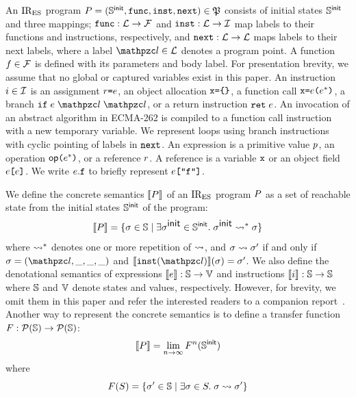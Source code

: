 An $\text{IR}_\text{ES}$ program $\prog = (\initstset, \getfunc,
\getinst, \getnext) \in \progset $ consists of initial states
$\mathbb{S}^{\textsf{init}}$ and three mappings; $\getfunc: \labset \rightarrow
\funcset$ and $\getinst: \labset \rightarrow \instset$ map labels to
their functions and instructions, respectively, and $\getnext: \labset
\rightarrow \labset$ maps labels to their next labels, where a label $\lab \in
\labset$ denotes a program point.  A function $f \in \mathcal{F}$ is defined
with its parameters and body label.  For presentation brevity, we assume that no
global or captured variables exist in this paper.  An instruction $i \in
\mathcal{I}$ is an assignment $\refer \kweq \expr$, an object allocation $\varx
\kweq \kwcl \kwcr$, a function call $\varx \kweq \expr \kwrl \expr^* \kwrr$, a
branch $\kwif \; \expr \; \lab \; \lab$, or a return instruction $\kwret \;
\expr$.  An invocation of an abstract algorithm in ECMA-262 is compiled to a
function call instruction with a new temporary variable.  We represent loops
using branch instructions with cyclic pointing of labels in $\getnext$.
An expression is a primitive value $p$, an operation $\op \kwrl \expr^*
\kwrr$, or a reference $r$.  A reference is a variable $\varx$ or an object
field $\expr \kwsl \expr \kwsr$.  We write $\expr.\varf$ to briefly represent
$\expr \kwsl \code{"f"} \kwsr$.

We define the concrete semantics $\llbracket{P}\rrbracket$ of an $\text{IR}_\text{ES}$ program $P$ as
a set of reachable state from the initial states $\mathbb{S}^{\textsf{init}}$ of the
program:
\[
  \sem{\prog} = \{ \st \in \stset \mid \exists \initst \in \initstset. \;
  \initst \trans^* \st \}
\]
where $\leadsto^*$ denotes one or more repetition of $\leadsto$, and
$\sigma \leadsto \sigma'$ if and only if $\st = (\lab, \_, \_, \_)$ and
$\sem{\getinst(\lab)}(\st) = \st'$.  We also define the denotational
semantics of expressions $\llbracket{e}\rrbracket: \mathbb{S} \rightarrow \mathbb{V}$ and
instructions $\llbracket{i}\rrbracket: \mathbb{S} \rightarrow \mathbb{S}$ where $\mathbb{S}$ and
$\mathbb{V}$ denote states and values, respectively.  However, for
brevity, we omit them in this paper and refer the interested readers to a
companion report~\cite{report}.  Another way to represent the concrete semantics
is to define a transfer function $F: \mathcal{P}(\mathbb{S}) \rightarrow
\mathcal{P}(\mathbb{S})$:
\[
  \llbracket{P}\rrbracket = \lim_{n \rightarrow \infty}F^n(\mathbb{S}^{\textsf{init}})
\]
where
\begin{equation}\label{eqn:transfer}
  \transfer(S) =
  \{ \st' \in \stset \mid \exists \st \in S. \; \st \trans \st' \}
\end{equation}

